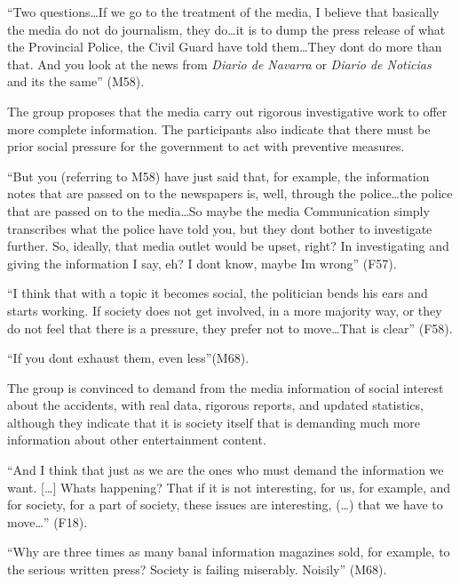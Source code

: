\enquote{Two questions\ldots If we go to the treatment of the media, I believe
that basically the media do not do journalism, they do\ldots it is to dump
the press release of what the Provincial Police, the Civil Guard have
told them\ldots They don\textquotesingle t do more than that. And you look
at the news from \emph{Diario de Navarra} or \emph{Diario de Noticias}
and it\textquotesingle s the same} (M58).

The group proposes that the media carry out rigorous investigative work
to offer more complete information. The participants also indicate that
there must be prior social pressure for the government to act with
preventive measures.

\enquote{But you (referring to M58) have just said that, for example, the
information notes that are passed on to the newspapers is, well, through
the police\ldots the police that are passed on to the media\ldots So
maybe the media Communication simply transcribes what the police have
told you, but they don\textquotesingle t bother to investigate further.
So, ideally, that media outlet would be upset, right? In investigating
and giving the information I say, eh? I don\textquotesingle t know,
maybe I\textquotesingle m wrong} (F57).

\enquote{I think that with a topic it becomes social, the politician bends his
ears and starts working. If society does not get involved, in a more
majority way, or they do not feel that there is a pressure, they prefer
not to move\ldots That is clear} (F58).

\enquote{If you don\textquotesingle t exhaust them, even less}(M68).

The group is convinced to demand from the media information of social
interest about the accidents, with real data, rigorous reports, and
updated statistics, although they indicate that it is society itself
that is demanding much more information about other entertainment
content.

\enquote{And I think that just as we are the ones who must demand the
information we want. [\ldots] What\textquotesingle s happening? That if
it is not interesting, for us, for example, and for society, for a part
of society, these issues are interesting, (\ldots) that we have to move\ldots}
(F18).

\enquote{Why are three times as many banal information magazines sold, for
example, to the serious written press? Society is failing miserably.
Noisily} (M68).
